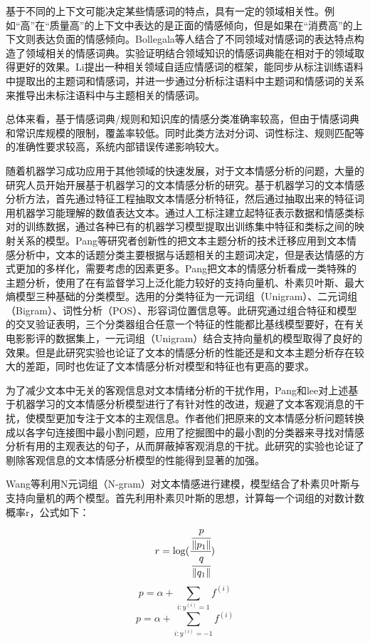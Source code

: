 基于不同的上下文可能决定某些情感词的特点，具有一定的领域相关性。例如“高”在“质量高”的上下文中表达的是正面的情感倾向，但是如果在“消费高”的上下文则表达负面的情感倾向。Bollegala等人结合了不同领域对情感词的表达特点构造了领域相关的情感词典。实验证明结合领域知识的情感词典能在相对于的领域取得更好的效果。Li提出一种相关领域自适应情感词的框架，能同步从标注训练语料中提取出的主题词和情感词，并进一步通过分析标注语料中主题词和情感词的关系来推导出未标注语料中与主题相关的情感词。

总体来看，基于情感词典/规则和知识库的情感分类准确率较高，但由于情感词典和常识库规模的限制，覆盖率较低。同时此类方法对分词、词性标注、规则匹配等的准确性要求较高，系统内部错误传递影响较大。


随着机器学习成功应用于其他领域的快速发展，对于文本情感分析的问题，大量的研究人员开始开展基于机器学习的文本情感分析的研究。基于机器学习的文本情感分析方法，首先通过特征工程抽取文本情感分析特征，然后通过抽取出来的特征词用机器学习能理解的数值表达文本。通过人工标注建立起特征表示数据和情感类标对的训练数据，通过各种已有的机器学习模型提取出训练集中特征和类标之间的映射关系的模型。Pang等研究者创新性的把文本主题分析的技术迁移应用到文本情感分析中，文本的话题分类主要根据与话题相关的主题词决定，但是表达情感的方式更加的多样化，需要考虑的因素更多。Pang把文本的情感分析看成一类特殊的主题分析，使用了在有监督学习上泛化能力较好的支持向量机、朴素贝叶斯、最大熵模型三种基础的分类模型。选用的分类特征为一元词组（Unigram）、二元词组（Bigram）、词性分析（POS）、形容词位置信息等。此研究通过组合特征和模型的交叉验证表明，三个分类器组合任意一个特征的性能都比基线模型要好，在有关电影影评的数据集上，一元词组（Unigram）结合支持向量机的模型取得了良好的效果。但是此研究实验也论证了文本的情感分析的性能还是和文本主题分析存在较大的差距，同时也佐证了文本情感分析对模型和特征也有更高的要求。

为了减少文本中无关的客观信息对文本情绪分析的干扰作用，Pang和lee对上述基于机器学习的文本情感分析模型进行了有针对性的改进，规避了文本客观消息的干扰，使模型更加专注于文本的主观信息。作者他们把原来的文本情感分析问题转换成以各字句连接图中最小割问题，应用了挖掘图中的最小割的分类器来寻找对情感分析有用的主观表达的句子，从而屏蔽掉客观消息的干扰。此研究的实验也论证了剔除客观信息的文本情感分析模型的性能得到显著的加强。

Wang等利用N元词组（N-gram）对文本情感进行建模，模型结合了朴素贝叶斯与支持向量机的两个模型。首先利用朴素贝叶斯的思想，计算每一个词组的对数计数概率r，公式如下：
\begin{equation}\label{f1favor}r=\log(\cfrac{\cfrac{p}{\|p_1\|}}{\cfrac{q}{\|q_1\|}})\end{equation}
\begin{equation}\label{f1favor}p=\alpha + \sum_{i:y^{(i)}=1}f^{(i)}\end{equation}
\begin{equation}\label{f1favor}p=\alpha + \sum_{i:y^{(i)}=-1}f^{(i)}\end{equation}

